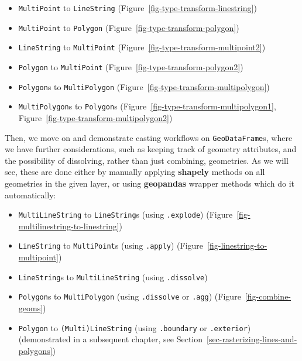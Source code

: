 \documentclass[
  letterpaper,
]{krantz}
\providecommand{\tightlist}{%
  \setlength{\itemsep}{0pt}\setlength{\parskip}{0pt}}\usepackage{longtable,booktabs,array}
\begin{document}
\begin{itemize}
\tightlist
\item
  \texttt{\textquotesingle{}MultiPoint\textquotesingle{}} to
  \texttt{\textquotesingle{}LineString\textquotesingle{}}
  (Figure~\ref{fig-type-transform-linestring})
\item
  \texttt{\textquotesingle{}MultiPoint\textquotesingle{}} to
  \texttt{\textquotesingle{}Polygon\textquotesingle{}}
  (Figure~\ref{fig-type-transform-polygon})
\item
  \texttt{\textquotesingle{}LineString\textquotesingle{}} to
  \texttt{\textquotesingle{}MultiPoint\textquotesingle{}}
  (Figure~\ref{fig-type-transform-multipoint2})
\item
  \texttt{\textquotesingle{}Polygon\textquotesingle{}} to
  \texttt{\textquotesingle{}MultiPoint\textquotesingle{}}
  (Figure~\ref{fig-type-transform-polygon2})
\item
  \texttt{\textquotesingle{}Polygon\textquotesingle{}}s to
  \texttt{\textquotesingle{}MultiPolygon\textquotesingle{}}
  (Figure~\ref{fig-type-transform-multipolygon})
\item
  \texttt{\textquotesingle{}MultiPolygon\textquotesingle{}}s to
  \texttt{\textquotesingle{}Polygon\textquotesingle{}}s
  (Figure~\ref{fig-type-transform-multipolygon1},
  Figure~\ref{fig-type-transform-multipolygon2})
\end{itemize}

Then, we move on and demonstrate casting workflows on
\texttt{GeoDataFrame}s, where we have further considerations, such as
keeping track of geometry attributes, and the possibility of dissolving,
rather than just combining, geometries. As we will see, these are done
either by manually applying \textbf{shapely} methods on all geometries
in the given layer, or using \textbf{geopandas} wrapper methods which do
it automatically:

\begin{itemize}
\tightlist
\item
  \texttt{\textquotesingle{}MultiLineString\textquotesingle{}} to
  \texttt{\textquotesingle{}LineString\textquotesingle{}}s (using
  \texttt{.explode}) (Figure~\ref{fig-multilinestring-to-linestring})
\item
  \texttt{\textquotesingle{}LineString\textquotesingle{}} to
  \texttt{\textquotesingle{}MultiPoint\textquotesingle{}}s (using
  \texttt{.apply}) (Figure~\ref{fig-linestring-to-multipoint})
\item
  \texttt{\textquotesingle{}LineString\textquotesingle{}}s to
  \texttt{\textquotesingle{}MultiLineString\textquotesingle{}} (using
  \texttt{.dissolve})
\item
  \texttt{\textquotesingle{}Polygon\textquotesingle{}}s to
  \texttt{\textquotesingle{}MultiPolygon\textquotesingle{}} (using
  \texttt{.dissolve} or \texttt{.agg}) (Figure~\ref{fig-combine-geoms})
\item
  \texttt{\textquotesingle{}Polygon\textquotesingle{}} to
  \texttt{\textquotesingle{}(Multi)LineString\textquotesingle{}} (using
  \texttt{.boundary} or \texttt{.exterior}) (demonstrated in a
  subsequent chapter, see
  Section~\ref{sec-rasterizing-lines-and-polygons})
\end{itemize}
\end{document}
